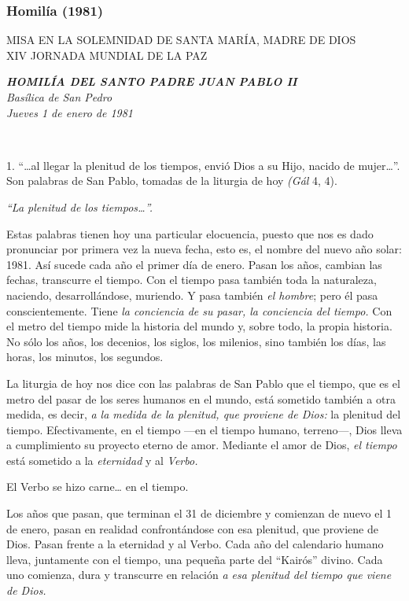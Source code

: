 \subsubsection{Homilía (1981)}

MISA EN LA SOLEMNIDAD DE SANTA MARÍA, MADRE DE DIOS\\
XIV JORNADA MUNDIAL DE LA PAZ

\emph{\textbf{HOMILÍA DEL SANTO PADRE JUAN PABLO
		II}\\[2\baselineskip]Basílica de San Pedro\\
	Jueves 1 de enero de 1981}

~

1. ``\ldots{}al llegar la plenitud de los tiempos, envió Dios a su Hijo,
nacido de mujer\ldots{}''. Son palabras de San Pablo, tomadas de la
liturgia de hoy \emph{(Gál} 4, 4).

\emph{``La plenitud de los tiempos\ldots{}''.}

Estas palabras tienen hoy una particular elocuencia, puesto que nos es
dado pronunciar por primera vez la nueva fecha, esto es, el nombre del
nuevo año solar: 1981. Así sucede cada año el primer día de enero. Pasan
los años, cambian las fechas, transcurre el tiempo. Con el tiempo pasa
también toda la naturaleza, naciendo, desarrollándose, muriendo. Y pasa
también \emph{el hombre}; pero él pasa conscientemente. Tiene \emph{la
	conciencia de su pasar, la conciencia del tiempo.} Con el metro del
tiempo mide la historia del mundo y, sobre todo, la propia historia. No
sólo los años, los decenios, los siglos, los milenios, sino también los
días, las horas, los minutos, los segundos.

La liturgia de hoy nos dice con las palabras de San Pablo que el tiempo,
que es el metro del pasar de los seres humanos en el mundo, está
sometido también a otra medida, es decir, \emph{a la medida de la
	plenitud, que proviene de Dios:} la plenitud del tiempo. Efectivamente,
en el tiempo ---en el tiempo humano, terreno---, Dios lleva a
cumplimiento su proyecto eterno de amor. Mediante el amor de Dios,
\emph{el tiempo} está sometido a la \emph{eternidad} y al \emph{Verbo.}

El Verbo se hizo carne\ldots{} en el tiempo.

Los años que pasan, que terminan el 31 de diciembre y comienzan de nuevo
el 1 de enero, pasan en realidad confrontándose con esa plenitud, que
proviene de Dios. Pasan frente a la eternidad y al Verbo. Cada año del
calendario humano lleva, juntamente con el tiempo, una pequeña parte del
``Kairós'' divino. Cada uno comienza, dura y transcurre en relación
\emph{a esa plenitud del tiempo que viene de Dios.}

